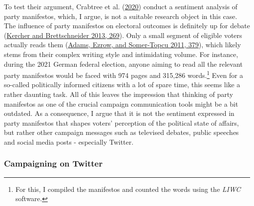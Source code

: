 \documentclass[a4paper,11pt]{article}
\begin{document}
To test their argument, Crabtree et al. (\protect\hyperlink{ref-crabtreeItNotOnly2020}{2020}) conduct a sentiment analysis of party manifestos, which, I argue, is not a suitable research object in this case. The influence of party manifestos on electoral outcomes is definitely up for debate (\protect\hyperlink{ref-kercherWahlprogrammeAlsPflichtubung2013}{Kercher and Brettschneider 2013, 269}). Only a small segment of eligible voters actually reads them (\protect\hyperlink{ref-adamsAnybodyListeningEvidence2011}{Adams, Ezrow, and Somer-Topcu 2011, 379}), which likely stems from their complex writing style and intimidating volume. For instance, during the 2021 German federal election, anyone aiming to read all the relevant party manifestos would be faced with 974 pages and 315,286 words.\footnote{For this, I compiled the manifestos and counted the words using the \emph{LIWC} software.} Even for a so-called politically informed citizens with a lot of spare time, this seems like a rather daunting task. All of this leaves the impression that thinking of party manifestos as one of the crucial campaign communication tools might be a bit outdated. As a consequence, I argue that it is not the sentiment expressed in party manifestos that shapes voters' perception of the political state of affairs, but rather other campaign messages such as televised debates, public speeches and social media posts - especially Twitter.

\hypertarget{campaigningtwitter}{%
\subsubsection{Campaigning on Twitter}\label{campaigningtwitter}}
\end{document}
